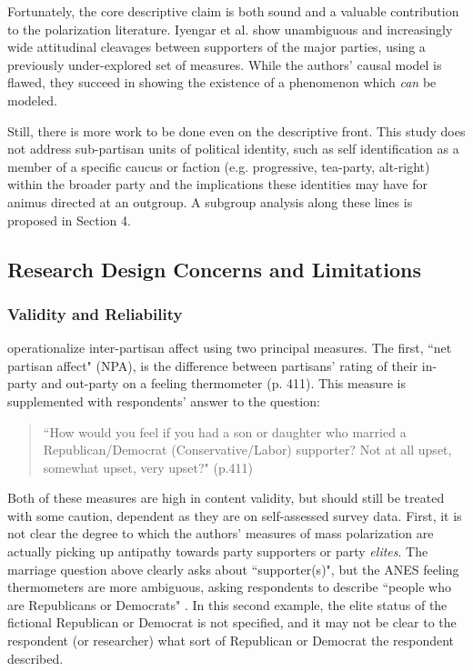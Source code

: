 \documentclass[12pt]{article}
\begin{document}
Fortunately, the core descriptive claim is both sound and a valuable contribution to the polarization literature. Iyengar et al. show unambiguous and increasingly wide attitudinal cleavages between supporters of the major parties, using a previously under-explored set of measures. While the authors' causal model is flawed, they succeed in showing the existence of a phenomenon which \textit{can} be modeled.

Still, there is more work to be done even on the descriptive front. This study does not address sub-partisan units of political identity, such as self identification as a member of a specific caucus or faction (e.g. progressive, tea-party, alt-right) within the broader party and the implications these identities may have for animus directed at an outgroup. A subgroup analysis along these lines is proposed in Section 4.



\subsection{Research Design Concerns and Limitations}

\subsubsection{Validity and Reliability}
\citeauthor{iyengar2012affect} operationalize inter-partisan affect using two principal measures. The first, ``net partisan affect" (NPA), is the difference between partisans' rating of their in-party and out-party on a feeling thermometer (p. 411). This measure is supplemented with respondents' answer to the question: 
\begin{quote}
``How would you feel if you had a son or daughter who married a Republican/Democrat (Conservative/Labor) supporter? Not at all upset, somewhat upset, very upset?" (p.411)
\end{quote}
Both of these measures are high in content validity, but should still be treated with some caution, dependent as they are on self-assessed survey data. First, it is not clear the degree to which the authors' measures of mass polarization are actually picking up antipathy towards party supporters or party \textit{elites}. The marriage question above clearly asks about ``supporter(s)", but the ANES feeling thermometers are more ambiguous, asking respondents to describe ``people who are Republicans or Democrats" \citep[p. 412]{iyengar2012affect}. In this second example, the elite status of the fictional Republican or Democrat is not specified, and it may not be clear to the respondent (or researcher) what sort of Republican or Democrat the respondent described.
\end{document}
